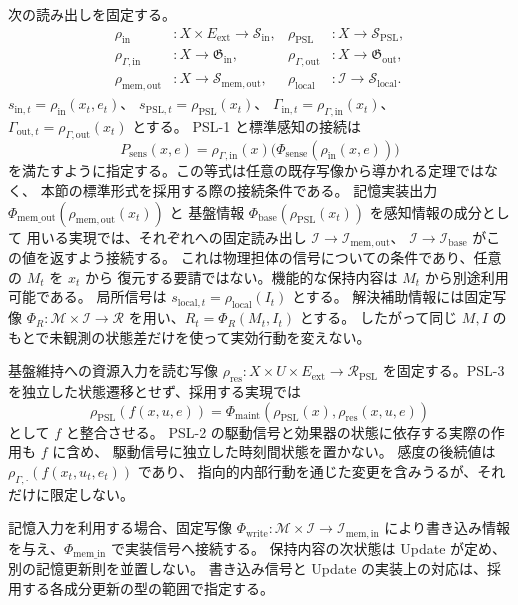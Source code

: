 \begin{definition}
\label{def:s4_psl_sources}
次の読み出しを固定する。
\[
\begin{aligned}
\rho_{\mathrm{in}}&:X\times E_{\mathrm{ext}}\to\mathcal S_{\mathrm{in}},&
\rho_{\mathrm{PSL}}&:X\to\mathcal S_{\mathrm{PSL}},\\
\rho_{\Gamma,\mathrm{in}}&:X\to\mathfrak G_{\mathrm{in}},&
\rho_{\Gamma,\mathrm{out}}&:X\to\mathfrak G_{\mathrm{out}},\\
\rho_{\mathrm{mem,out}}&:X\to\mathcal S_{\mathrm{mem},\mathrm{out}},&
\rho_{\mathrm{local}}&:\mathcal I\to\mathcal S_{\mathrm{local}}.
\end{aligned}
\]
$s_{\mathrm{in},t}=\rho_{\mathrm{in}}(x_t,e_t)$、
$s_{\mathrm{PSL},t}=\rho_{\mathrm{PSL}}(x_t)$、
$\Gamma_{\mathrm{in},t}=\rho_{\Gamma,\mathrm{in}}(x_t)$、
$\Gamma_{\mathrm{out},t}=\rho_{\Gamma,\mathrm{out}}(x_t)$ とする。
PSL-1 と標準感知の接続は
\[
P_{\mathrm{sens}}(x,e)=
\rho_{\Gamma,\mathrm{in}}(x)
 \bigl(\Phi_{\mathrm{sense}}(\rho_{\mathrm{in}}(x,e))\bigr)
\]
を満たすように指定する。この等式は任意の既存写像から導かれる定理ではなく、
本節の標準形式を採用する際の接続条件である。
記憶実装出力 $\Phi_{\mathrm{mem\_out}}(\rho_{\mathrm{mem,out}}(x_t))$ と
基盤情報 $\Phi_{\mathrm{base}}(\rho_{\mathrm{PSL}}(x_t))$ を感知情報の成分として
用いる実現では、それぞれへの固定読み出し
$\mathcal I\to\mathcal I_{\mathrm{mem},\mathrm{out}}$、
$\mathcal I\to\mathcal I_{\mathrm{base}}$ がこの値を返すよう接続する。
これは物理担体の信号についての条件であり、任意の $M_t$ を $x_t$ から
復元する要請ではない。機能的な保持内容は $M_t$ から別途利用可能である。
局所信号は $s_{\mathrm{local},t}=\rho_{\mathrm{local}}(I_t)$ とする。
解決補助情報には固定写像 $\Phi_R:\mathcal M\times\mathcal I\to\mathcal R$
を用い、$R_t=\Phi_R(M_t,I_t)$ とする。
したがって同じ $M,I$ のもとで未観測の状態差だけを使って実効行動を変えない。

基盤維持への資源入力を読む写像
$\rho_{\mathrm{res}}:X\times U\times E_{\mathrm{ext}}\to\mathcal R_{\mathrm{PSL}}$
を固定する。PSL-3を独立した状態遷移とせず、採用する実現では
\[
\rho_{\mathrm{PSL}}(f(x,u,e))=
\Phi_{\mathrm{maint}}(\rho_{\mathrm{PSL}}(x),\rho_{\mathrm{res}}(x,u,e))
\]
として $f$ と整合させる。
PSL-2 の駆動信号と効果器の状態に依存する実際の作用も $f$ に含め、
駆動信号に独立した時刻間状態を置かない。
感度の後続値は $\rho_{\Gamma,\cdot}(f(x_t,u_t,e_t))$ であり、
指向的内部行動を通じた変更を含みうるが、それだけに限定しない。

記憶入力を利用する場合、固定写像
$\Phi_{\mathrm{write}}:\mathcal M\times\mathcal I\to\mathcal I_{\mathrm{mem},\mathrm{in}}$
により書き込み情報を与え、$\Phi_{\mathrm{mem\_in}}$ で実装信号へ接続する。
保持内容の次状態は Update が定め、別の記憶更新則を並置しない。
書き込み信号と Update の実装上の対応は、採用する各成分更新の型の範囲で指定する。
\end{definition}


